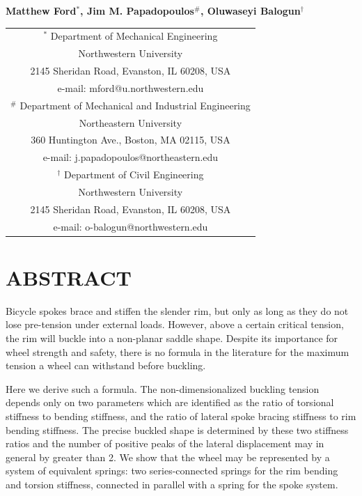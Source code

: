 \documentclass{bmd2016p}
\begin{document}
\begin{center}
\end{center}

\begin{center}
\normalsize{\bf{Matthew Ford$^{*}$, Jim M. Papadopoulos$^\#$, 
            Oluwaseyi Balogun$^\dag$}}
\end{center} 

\begin{center}
\begin{tabular}{c}
$^*$ Department of Mechanical Engineering\\
Northwestern University\\
2145 Sheridan Road, Evanston, IL 60208, USA\\
e-mail: mford@u.northwestern.edu\\[2.5ex]

$^\#$ Department of Mechanical and Industrial Engineering\\
Northeastern University\\
360 Huntington Ave., Boston, MA 02115, USA\\
e-mail: j.papadopoulos@northeastern.edu\\[2.5ex]

$^\dag$ Department of Civil Engineering\\
Northwestern University\\
2145 Sheridan Road, Evanston, IL 60208, USA\\
e-mail: o-balogun@northwestern.edu\\
\end{tabular}
\end{center}

\section*{ABSTRACT}
Bicycle spokes brace and stiffen the slender rim, but only as long as they do not lose pre-tension under external loads. However, above a certain critical tension, the rim will buckle into a non-planar saddle shape. Despite its importance for wheel strength and safety, there is no formula in the literature for the maximum tension a wheel can withstand before buckling.

Here we derive such a formula. The non-dimensionalized buckling tension depends only on two parameters which are identified as the ratio of torsional stiffness to bending stiffness, and the ratio of lateral spoke bracing stiffness to rim bending stiffness. The precise buckled shape is determined by these two stiffness ratios and the number of positive peaks of the lateral displacement may in general by greater than 2. We show that the wheel may be represented by a system of equivalent springs: two series-connected springs for the rim bending and torsion stiffness, connected in parallel with a spring for the spoke system.
\end{document}
